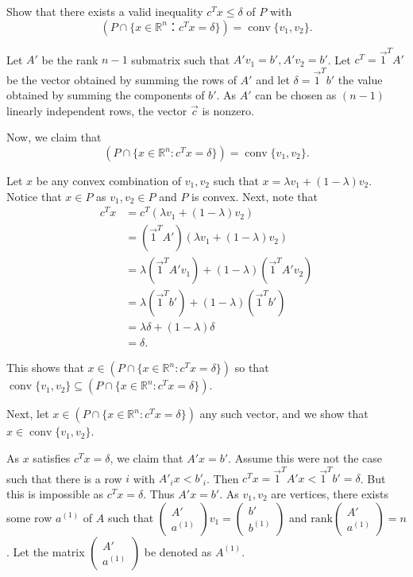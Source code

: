\documentclass[11pt]{article}
\DeclareMathOperator{\conv}{conv}
\newcommand{\setR}{\mathbb{R}}
\newcommand{\rank}{\mathrm{rank}}
\begin{document}
\begin{enumerate}[1)]
Show that there exists a valid inequality $c^Tx ≤ δ$ of $P$ with
\begin{displaymath}
 \left( P ∩ \{ x ∈ ℝ^n ： c^Tx = δ \} \right) = \conv\{v_1,v_2\}. 
\end{displaymath}



\begin{solution}
Let $A'$ be the rank $n-1$ submatrix such that $A'v_1 = b', A'v_2 = b'$. Let $c^T = \vec{1}^TA'$ be the vector obtained by summing the rows of $A'$ and let $\delta = \vec{1}^Tb'$ the value obtained by summing the components of $b'$. As $A'$ can be chosen as $(n-1)$ linearly independent rows, the vector $\vec{c}$ is nonzero. 

Now, we claim that $$(P \cap \{x \in \setR^n: c^Tx = \delta\}) = \conv\{v_1, v_2\}.$$

Let $x$ be any convex combination of $v_1, v_2$ such that $x = \lambda v_1 + (1 - \lambda)v_2$. Notice that $x \in P$ as $v_1, v_2 \in P$ and $P$ is convex. Next, note that
\begin{align*}
c^Tx & = c^T ( \lambda v_1 + (1 - \lambda)v_2) \\
& = (\vec{1}^TA') (\lambda v_1 + (1 - \lambda)v_2) \\
& = \lambda (\vec{1}^T A' v_1) + (1-\lambda)(\vec{1}^TA' v_2) \\
& = \lambda (\vec{1}^T b') + (1-\lambda)(\vec{1}^T b') \\
& = \lambda \delta + (1-\lambda)\delta \\
& = \delta. 
\end{align*}

This shows that $x \in (P \cap \{x \in \setR^n: c^Tx = \delta\})$ so that $ \conv\{v_1, v_2\} \subseteq (P \cap \{x \in \setR^n: c^Tx = \delta\})$. 


Next, let $x \in  (P \cap \{x \in \setR^n: c^Tx = \delta\})$ any such vector, and we show that $x \in  \conv\{v_1, v_2\}$. 

As $x$ satisfies $c^Tx = \delta$, we claim that $A'x = b'$. Assume this were not the case such that there is a row $i$ with $A'_i x < b'_i$. Then $c^Tx = \vec{1}^T A' x < \vec{1}^T b' = \delta$. But this is impossible as $c^Tx = \delta$. Thus $A'x = b'$. As $v_1, v_2$ are vertices, there exists some row $a^{(1)}$ of $A$ such that $\begin{pmatrix} A' \\ a^{(1)} \end{pmatrix} v_1 = \begin{pmatrix} b' \\ b^{(1)} \end{pmatrix}$ and $\rank \begin{pmatrix} A' \\ a^{(1)}\end{pmatrix} = n$. Let the matrix $\begin{pmatrix} A' \\ a^{(1)} \end{pmatrix}$ be denoted as $A^{(1)}$. 


\end{solution}
\end{enumerate}
\end{document}
